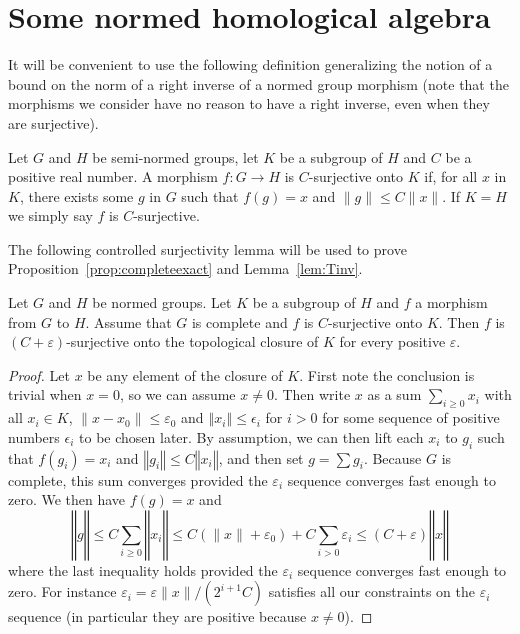 \section{Some normed homological algebra}%
\label{sec:some_normed_homological_algebra}

It will be convenient to use the following definition generalizing the notion
of a bound on the norm of a right inverse of a normed group morphism (note that
the morphisms we consider have no reason to have a right inverse, even when
they are surjective).

\begin{definition}
  \label{def:surjective_with_bound}
  Let $G$ and $H$ be semi-normed groups, let $K$ be a subgroup of $H$ and $C$ be
  a positive real number.
  A morphism $f : G → H$ is $C$-surjective onto $K$ if, for all $x$ in $K$,
  there exists some $g$ in $G$ such that $f(g) = x$ and $\|g\| ≤ C\|x\|$.
  If $K = H$ we simply say $f$ is $C$-surjective.
\end{definition}

The following controlled surjectivity lemma will be used to prove
Proposition~\ref{prop:completeexact} and Lemma~\ref{lem:Tinv}.

\begin{lemma}
  \label{lem:closure_surjective}
  \leanok
  Let $G$ and $H$ be normed groups. Let $K$ be a subgroup of
  $H$ and $f$ a morphism from $G$ to $H$.  Assume that $G$ is complete and
  $f$ is $C$-surjective onto $K$. Then $f$ is $(C + ε)$-surjective onto
  the topological closure of $K$ for every positive $ε$.
\end{lemma}

\begin{proof}\leanok
  Let $x$ be any element of the closure of $K$.
  First note the conclusion is trivial when $x = 0$, so we can assume
  $x ≠ 0$. Then write $x$ as a sum
  $\sum_{i \ge 0} x_i$ with all $x_i \in K$, $\|x - x_0\| ≤ ε_0$ and
  $‖x_i‖\leq \epsilon_i$ for $i>0$ for some sequence of positive numbers
  $\epsilon_i$ to be chosen later.
  By assumption, we can then lift each $x_i$ to $g_i$ such that
  $f(g_i) = x_i$ and $‖g_i‖\leq C‖x_i‖$, and then set
  $g = \sum g_i$. Because $G$ is complete,
  this sum converges provided the $ε_i$ sequence converges fast enough to zero.
  We then have $f(g) = x$ and
  \[
    ‖g‖ ≤ C\sum_{i \geq 0} ‖x_i‖ ≤
    C(\|x\| + ε_0) + C\sum_{i>0} ε_i ≤
    (C + ε)‖x‖
  \]
  where the last inequality holds provided the $ε_i$ sequence converges fast
  enough to zero. For instance $ε_i = ε∥x∥/(2^{i+1}C)$ satisfies all
  our constraints on the $ε_i$ sequence (in particular they are positive
  because $x ≠ 0$).
\end{proof}

